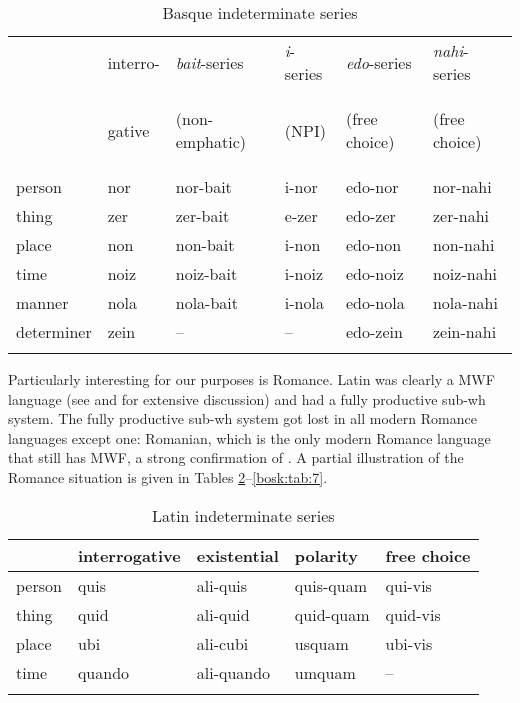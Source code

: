 \documentclass[output=paper,colorlinks,citecolor=brown]{langscibook}
\begin{document}
\begin{table}
\begin{tabularx}{\textwidth}{Xlllll}
\lsptoprule
& interro- & \textit{bait}-series & \textit{i}-series & \textit{edo}-series & \textit{nahi}-series\\
& gative& \begin{footnotesize}(non-emphatic)\end{footnotesize} & \begin{footnotesize}(NPI)\end{footnotesize} & \begin{footnotesize}(free choice)\end{footnotesize} & \begin{footnotesize}(free choice)\end{footnotesize}\\\midrule
person & nor & nor-bait & i-nor & edo-nor & nor-nahi\\
thing & zer & zer-bait & e-zer & edo-zer & zer-nahi\\
place & non & non-bait & i-non & edo-non & non-nahi\\
time & noiz & noiz-bait & i-noiz & edo-noiz & noiz-nahi\\
manner & nola & nola-bait & i-nola & edo-nola & nola-nahi\\
determiner & zein & -- & -- & edo-zein & zein-nahi\\
\lspbottomrule
\end{tabularx}
    \caption{Basque indeterminate series}
\label{bosk:tab:4}
\end{table}

Particularly interesting for our purposes is Romance. Latin was clearly a MWF language (see \citealt{Ledgeway2012} and \citealt{Dadan2019} for extensive discussion) and had a fully productive sub-wh system. The fully productive sub-wh system got lost in all modern Romance languages except one: Romanian, which is the only modern Romance language that still has MWF, a strong confirmation of . A partial illustration of the Romance situation is given in Tables \ref{bosk:tab:5}--\ref{bosk:tab:7}.


\begin{table}
\begin{tabularx}{.85\textwidth}{Xllll}
\lsptoprule
& interrogative & existential & polarity & {free choice}\\\midrule
person    & quis & ali-quis  & quis-quam & qui-vis\\
thing & quid & ali-quid  & quid-quam & quid-vis\\
place & ubi  &  ali-cubi & usquam &  ubi-vis\\
time & quando  & ali-quando & umquam & --\\
\lspbottomrule
\end{tabularx}
    \caption{Latin indeterminate series}
\label{bosk:tab:5}
\end{table}
\end{document}
